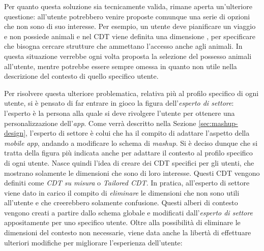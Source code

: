 Per quanto questa soluzione sia tecnicamente valida, rimane aperta un'ulteriore questione: all'utente potrebbero venire proposte comunque una serie di opzioni che non sono di suo interesse. Per esempio, un utente deve pianificare un viaggio e non possiede animali e nel CDT viene definita una dimensione , per specificare che bisogna cercare strutture che ammettano l'accesso anche agli animali. In questa situazione verrebbe ogni volta proposta la selezione del possesso animali all'utente, mentre potrebbe essere sempre omessa in quanto non utile nella descrizione del contesto di quello specifico utente.

Per risolvere questa ulteriore problematica, relativa più al profilo specifico di ogni utente, si è pensato di far entrare in gioco la figura dell'\emph{esperto di settore}: l'esperto è la persona alla quale si deve rivolgere l'utente per ottenere una personalizzazione dell'\emph{app}. Come verrà descritto nella Sezione \ref{sec:mashup-design}, l'esperto di settore è colui che ha il compito di adattare l'aspetto della \emph{mobile app}, andando a  modificare lo schema di \emph{mashup}. Si è deciso dunque che si tratta della figura più indicata anche per adattare il contesto al profilo specifico di ogni utente. Nasce quindi l'idea di creare dei CDT specifici per gli utenti, che mostrano solamente le dimensioni che sono di loro interesse. Questi CDT vengono definiti come \emph{CDT su misura} o \emph{Tailored CDT}. In pratica, all'esperto di settore viene dato in carico il compito di \emph{eliminare} le dimensioni che non sono utili all'utente e che creerebbero solamente confusione. Questi alberi di contesto vengono creati a partire dallo schema globale e modificati dall'\emph{esperto di settore} appositamente per uno specifico utente. Oltre alla possibilità di eliminare le dimensioni del contesto non necessarie, viene data anche la libertà di effettuare ulteriori modifiche per migliorare l'esperienza dell'utente:

